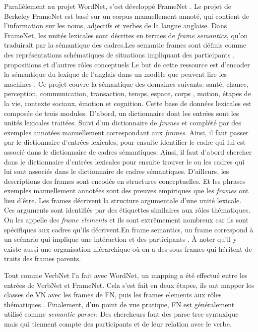 Parallèlement au projet WordNet, s'est développé FrameNet \citep{BakerBerkeleyFrameNetProject1998}. Le projet de Berkeley FrameNet est basé sur un corpus manuellement annoté, qui contient de l'information sur les noms, adjectifs et verbes de la langue anglaise. Dans FrameNet, les unités lexicales sont décrites en termes de \emph{frame semantics}, qu'on traduirait par la sémantique des cadres.Les semantic frames sont définis comme des représentations schématiques de situations impliquant des participants , propositions et d'autres rôles conceptuels Le but de cette ressource est d'encoder la sémantique du lexique de l'anglais dans un modèle que peuvent lire les machines \citep{BakerBerkeleyFrameNetProject1998}. Ce projet couvre la sémantique des domaines suivants: santé, chance, perception, communication, transaction, temps, espace, corps , motion, étapes de la vie, contexte sociaux, émotion et cognition. Cette base de données lexicales est composée de trois modules. D'abord, un dictionnaire dont les entrées sont les unités lexicales traitées. Suivi d'un dictionnaire de \emph{frames} et complété par des exemples annotées manuellement correspondant aux \emph{frames}. Ainsi, il faut passer par le dictionnaire d'entrées lexicales, pour ensuite identifier le cadre qui lui est associé dans le dictionnaire de cadres sémantiques. Ainsi, il faut d'abord chercher dans le dictionnaire d'entrées lexicales pour ensuite trouver le ou les cadres qui lui sont associés dans le dictionnaire de cadres sémantiques. D'ailleurs, les descriptions des frames sont encodés en structures conceptuelles. Et les phrases exemples manuellement annotées sont des preuves empiriques que les \emph{frames} ont lieu d'être. Les frames décrivent la structure argumentale d'une unité lexicale. Ces arguments sont identifiés par des étiquettes similaires aux rôles thématiques. On les appelle des \emph{frame elements} et ils sont extrêmement nombreux car ils sont spécifiques aux cadres qu'ils décrivent.En frame semantics, un frame correspond à un scénario qui implique une intéraction et des participants \citep{Shi:2005:PPT:2132047.2132058}. À noter qu'il y existe aussi une organisation hiérarchique où on a des sous-frames qui héritent de traits des frames parents. 

Tout comme VerbNet l'a fait avec WordNet, un mapping a été effectué entre les entrées de VerbNet et FrameNet. Cela s'est fait en deux étapes, ils ont mapper les classes de VN avec les frames de FN, puis les frames elements aux rôles thématiques \citep{Shi:2005:PPT:2132047.2132058}. Finalement, d'un point de vue pratique, FN est généralement utilisé comme \emph{semantic parser}. Des chercheurs font des parse tree syntaxique mais qui tiennent compte des participants et de leur relation avec le verbe\citep{Shi:2005:PPT:2132047.2132058}.

